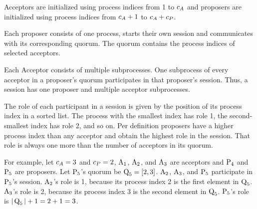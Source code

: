 Acceptors are initialized using process indices from 1 to $c_A$ and proposers are initialized using process indices from $c_A + 1$ to $c_A + c_P$.

Each proposer consists of one process, starts their own session and communicates with its corresponding quorum.
The quorum contains the process indices of selected acceptors.

Each Acceptor consists of multiple subprocesses.
One subprocess of every acceptor in a proposer's quorum participates in that proposer's session.
Thus, a session has one proposer and multiple acceptor subprocesses.

The role of each participant in a session is given by the position of its process index in a sorted list.
The process with the smallest index has role 1, the second-smallest index has role 2, and so on.
Per definition proposers have a higher process index than any acceptor and obtain the highest role in the session.
That role is always one more than the number of acceptors in its quorum.

For example, let $c_A = 3$ and $c_P = 2$, $\operatorname{A_{1}}$, $\operatorname{A_{2}}$, and $\operatorname{A_{3}}$ are acceptors and $\operatorname{P_{4}}$ and $\operatorname{P_{5}}$ are proposers.
Let $\operatorname{P_{5}}$'s quorum be $\operatorname{Q}_5 = \left[2, 3\right]$.
$\operatorname{A_{2}}$, $\operatorname{A_{3}}$, and $\operatorname{P_{5}}$ participate in $\operatorname{P_{5}}$'s session.
$\operatorname{A_{2}}$'s role is 1, because its process index 2 is the first element in $\operatorname{Q}_5$.
$\operatorname{A_{3}}$'s role is 2, because its process index 3 is the second element in $\operatorname{Q}_5$.
$\operatorname{P_{5}}$'s role is $|\operatorname{Q}_5| + 1 = 2 + 1 = 3$.

